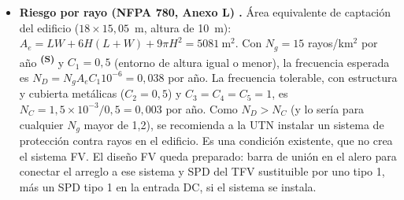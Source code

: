 \documentclass[12pt]{article}
\newcommand{\supuesto}{\textsuperscript{\textcolor{orange!80!black}{\textbf{(S)}}}}
\begin{document}
\begin{itemize}
\item \textbf{Riesgo por rayo (NFPA 780, Anexo L) \cite{nfpa780}.}\label{sec:rayo} Área equivalente de captación del edificio ($18\times15{,}05$~m, altura de 10~m): $A_e=LW+6H(L+W)+9\pi H^2=\SI{5081}{\meter\squared}$. Con $N_g=15$ rayos/km$^2$ por año \supuesto{} y $C_1=0{,}5$ (entorno de altura igual o menor), la frecuencia esperada es $N_D=N_g A_e C_1 10^{-6}=0{,}038$ por año. La frecuencia tolerable, con estructura y cubierta metálicas ($C_2=0{,}5$) y $C_3=C_4=C_5=1$, es $N_C=1{,}5\times10^{-3}/0{,}5=0{,}003$ por año. Como $N_D>N_C$ (y lo sería para cualquier $N_g$ mayor de 1,2), se recomienda a la UTN instalar un sistema de protección contra rayos en el edificio. Es una condición existente, que no crea el sistema FV. El diseño FV queda preparado: barra de unión en el alero para conectar el arreglo a ese sistema y SPD del TFV sustituible por uno tipo 1, más un SPD tipo 1 en la entrada DC, si el sistema se instala.
\end{itemize}
\end{document}
